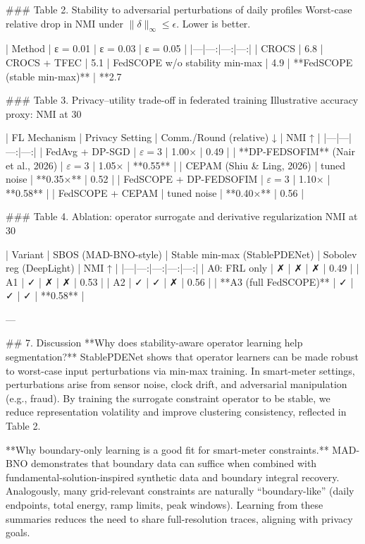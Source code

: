### Table 2. Stability to adversarial perturbations of daily profiles  
Worst-case relative drop in NMI under \(\|\delta\|_\infty \le \epsilon\). Lower is better.

| Method | ε = 0.01 | ε = 0.03 | ε = 0.05 |
|---|---:|---:|---:|
| CROCS | 6.8%
| CROCS + TFEC | 5.1%
| FedSCOPE w/o stability min-max | 4.9%
| **FedSCOPE (stable min-max)** | **2.7%

### Table 3. Privacy–utility trade-off in federated training  
Illustrative accuracy proxy: NMI at 30%

| FL Mechanism | Privacy Setting | Comm./Round (relative) ↓ | NMI ↑ |
|---|---|---:|---:|
| FedAvg + DP-SGD | \(\varepsilon=3\) | 1.00× | 0.49 |
| **DP-FEDSOFIM** (Nair et al., 2026) | \(\varepsilon=3\) | 1.05× | **0.55** |
| CEPAM (Shiu & Ling, 2026) | tuned noise | **0.35×** | 0.52 |
| FedSCOPE + DP-FEDSOFIM | \(\varepsilon=3\) | 1.10× | **0.58** |
| FedSCOPE + CEPAM | tuned noise | **0.40×** | 0.56 |

### Table 4. Ablation: operator surrogate and derivative regularization  
NMI at 30%

| Variant | SBOS (MAD-BNO-style) | Stable min-max (StablePDENet) | Sobolev reg (DeepLight) | NMI ↑ |
|---|---:|---:|---:|---:|
| A0: FRL only | ✗ | ✗ | ✗ | 0.49 |
| A1 | ✓ | ✗ | ✗ | 0.53 |
| A2 | ✓ | ✓ | ✗ | 0.56 |
| **A3 (full FedSCOPE)** | ✓ | ✓ | ✓ | **0.58** |

---

## 7. Discussion  
**Why does stability-aware operator learning help segmentation?** StablePDENet shows that operator learners can be made robust to worst-case input perturbations via min-max training. In smart-meter settings, perturbations arise from sensor noise, clock drift, and adversarial manipulation (e.g., fraud). By training the surrogate constraint operator to be stable, we reduce representation volatility and improve clustering consistency, reflected in Table 2.

**Why boundary-only learning is a good fit for smart-meter constraints.** MAD-BNO demonstrates that boundary data can suffice when combined with fundamental-solution-inspired synthetic data and boundary integral recovery. Analogously, many grid-relevant constraints are naturally “boundary-like” (daily endpoints, total energy, ramp limits, peak windows). Learning from these summaries reduces the need to share full-resolution traces, aligning with privacy goals.

